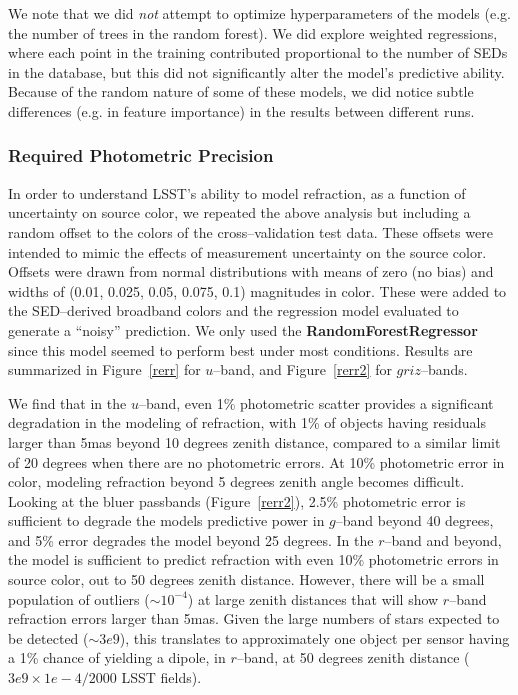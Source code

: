 \documentclass[DM,toc]{lsstdoc}
\begin{document}
We note that we did \textit{not} attempt to optimize hyperparameters of
the models (e.g. the number of trees in the random forest).  We did
explore weighted regressions, where each point in the training
contributed proportional to the number of SEDs in the database, but
this did not significantly alter the model's predictive ability.
Because of the random nature of some of these models, we did notice
subtle differences (e.g. in feature importance) in the results between
different runs.

\subsubsection{Required Photometric Precision \label{sec:rcolor}}

In order to understand LSST's ability to model refraction, as a
function of uncertainty on source color, we repeated the above
analysis but including a random offset to the colors of the
cross--validation test data.  These offsets were intended to mimic the
effects of measurement uncertainty on the source color.  Offsets were
drawn from normal distributions with means of zero (no bias) and
widths of (0.01, 0.025, 0.05, 0.075, 0.1) magnitudes in color.  These
were added to the SED--derived broadband colors and the regression
model evaluated to generate a ``noisy'' prediction.  We only used the
\textbf{RandomForestRegressor} since this model seemed to perform best
under most conditions.  Results are summarized in Figure~\ref{rerr}
for $u$--band, and Figure~\ref{rerr2} for $griz$--bands.

We find that in the $u$--band, even 1\% photometric scatter provides a
significant degradation in the modeling of refraction, with 1\% of
objects having residuals larger than 5mas beyond 10 degrees zenith
distance, compared to a similar limit of 20 degrees when there are no
photometric errors.  At 10\% photometric error in color, modeling
refraction beyond 5 degrees zenith angle becomes difficult.  Looking
at the bluer passbands (Figure~\ref{rerr2}), 2.5\% photometric error
is sufficient to degrade the models predictive power in $g$--band
beyond 40 degrees, and 5\% error degrades the model beyond 25 degrees.
In the $r$--band and beyond, the model is sufficient to predict
refraction with even 10\% photometric errors in source color, out to
50 degrees zenith distance.  However, there will be a small population
of outliers ($\sim 10^{-4}$) at large zenith distances that will show
$r$--band refraction errors larger than 5mas.  Given the large numbers
of stars expected to be detected ($\sim 3e9$), this translates to
approximately one object per sensor having a 1\% chance of yielding a
dipole, in $r$--band, at 50 degrees zenith distance ($3e9 \times 1e-4 /
2000$ LSST fields).
\end{document}
